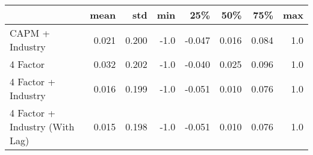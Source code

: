 \begin{tabular}{lrrrrrrr}
\toprule
{} &   mean &    std &  min &    25\% &    50\% &    75\% &  max \\
\midrule
 CAPM + Industry               &  0.021 &  0.200 & -1.0 & -0.047 &  0.016 &  0.084 &  1.0 \\
4 Factor                       &  0.032 &  0.202 & -1.0 & -0.040 &  0.025 &  0.096 &  1.0 \\
4 Factor + Industry            &  0.016 &  0.199 & -1.0 & -0.051 &  0.010 &  0.076 &  1.0 \\
4 Factor + Industry (With Lag) &  0.015 &  0.198 & -1.0 & -0.051 &  0.010 &  0.076 &  1.0 \\
\bottomrule
\end{tabular}
